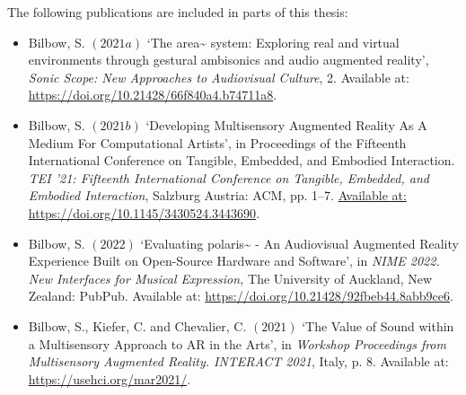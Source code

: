 \newpage \vspace*{8cm}

The following publications are included in parts of this thesis:
\begin{itemize}
    \item Bilbow, S. $(2021a)$ `The area\textasciitilde{} system: Exploring real and virtual environments through gestural ambisonics and audio augmented reality', \textit{Sonic Scope: New Approaches to Audiovisual Culture}, 2. Available at: \url{https://doi.org/10.21428/66f840a4.b74711a8}.
    \item Bilbow, S. $(2021b)$ `Developing Multisensory Augmented Reality As A Medium For Computational Artists', in Proceedings of the Fifteenth International Conference on Tangible, Embedded, and Embodied Interaction. \textit{TEI '21: Fifteenth International Conference on Tangible, Embedded, and Embodied Interaction}, Salzburg Austria: ACM, pp. 1–7. \url{Available at: https://doi.org/10.1145/3430524.3443690}.
    \item Bilbow, S. $(2022)$ `Evaluating polaris\textasciitilde{} - An Audiovisual Augmented Reality Experience Built on Open-Source Hardware and Software', in \textit{NIME 2022. New Interfaces for Musical Expression,} The University of Auckland, New Zealand: PubPub. Available at: \url{https://doi.org/10.21428/92fbeb44.8abb9ce6}.
    \item Bilbow, S., Kiefer, C. and Chevalier, C. $(2021)$ `The Value of Sound within a Multisensory Approach to AR in the Arts', in \textit{Workshop Proceedings from Multisensory Augmented Reality. INTERACT 2021}, Italy, p. 8. Available at: \url{https://usehci.org/mar2021/}.
\end{itemize}